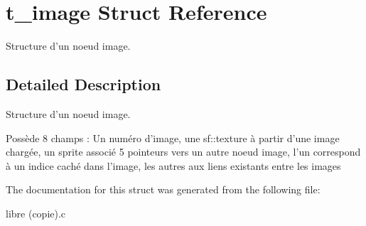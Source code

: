 \hypertarget{structt__image}{\section{t\-\_\-image Struct Reference}
\label{structt__image}
}


Structure d'un noeud image.  




\subsection{Detailed Description}
Structure d'un noeud image. 

Possède 8 champs \-: Un numéro d'image, une sf\-::texture à partir d'une image chargée, un sprite associé 5 pointeurs vers un autre noeud image, l'un correspond à un indice caché dans l'image, les autres aux liens existants entre les images 

The documentation for this struct was generated from the following file\-:\begin{DoxyCompactItemize}
\item 
libre (copie).\-c\end{DoxyCompactItemize}
